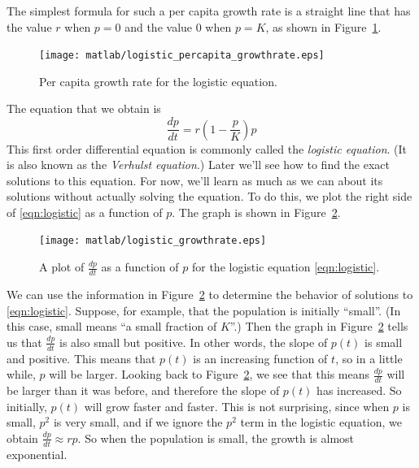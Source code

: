 \documentclass[reqno]{immbook}
\numberwithin{equation}{chapter}
\numberwithin{question}{section}
\numberwithin{theorem}{chapter}
\numberwithin{figure}{chapter}
\theoremstyle{definition}
\begin{document}
The simplest formula for such a
per capita growth rate is a straight line that has
the value $r$ when $p=0$ and the value $0$ when $p=K$, as shown in
Figure~\ref{fig:growthrate}.
\begin{figure}
\centerline{\texttt{[image: matlab/logistic\_percapita\_growthrate.eps]}} 
\caption{Per capita growth rate for the logistic equation.}
\label{fig:growthrate}
\end{figure} 
The equation that we obtain is
\begin{equation}
  \frac{dp}{dt} = r\left(1-\frac{p}{K}\right)p
\label{eqn:logistic}
\end{equation}
This first order differential equation is commonly called the \emph{logistic equation}.
(It is also known as the
\emph{Verhulst equation}.)
Later we'll see how to find the exact solutions to this equation.
For now, we'll learn as much as we can about its solutions without actually solving the
equation.  To do this, we plot the right side of \eqref{eqn:logistic} as a function of $p$.
The graph is shown in Figure~\ref{fig:logisticrhs}.
\begin{figure}
\centerline{\texttt{[image: matlab/logistic\_growthrate.eps]}} 
\caption{A plot of $\frac{dp}{dt}$ as a function of $p$ for the logistic
equation \eqref{eqn:logistic}.}
\label{fig:logisticrhs}
\end{figure}
We can use the information in Figure~\ref{fig:logisticrhs} to determine the
behavior of solutions to \eqref{eqn:logistic}.
Suppose, for example, that the population is initially ``small''.
(In this case, small means ``a small fraction of $K$''.)
Then the graph in Figure~\ref{fig:logisticrhs} tells us that
$\frac{dp}{dt}$ is also small but positive.  In other words, the slope
of $p(t)$ is small and positive.  This means that $p(t)$ is an increasing
function of $t$, so in a little while, $p$ will be larger.  Looking back to
Figure~\ref{fig:logisticrhs}, we see that this means $\frac{dp}{dt}$ will be
larger than it was before, and therefore the slope of $p(t)$ has increased.
So initially, $p(t)$ will grow faster and faster.  This is not surprising, since
when $p$ is small, $p^2$ is very small, and if we ignore the $p^2$ term in the
logistic equation, we obtain $\frac{dp}{dt} \approx rp$.  So when the
population is small, the growth is almost exponential.
\end{document}
